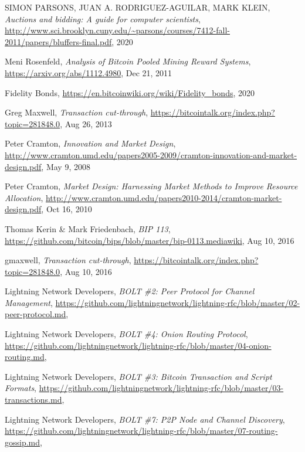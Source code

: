 \documentclass[10pt,a4paper]{article}
\theoremstyle{definition}
\begin{document}
\begin{thebibliography}{9}
    SIMON PARSONS, JUAN A. RODRIGUEZ-AGUILAR, MARK KLEIN, 
    \textit{Auctions and bidding: A guide for computer scientists},
    \url{http://www.sci.brooklyn.cuny.edu/~parsons/courses/7412-fall-2011/papers/bluffers-final.pdf},
    2020

    Meni Rosenfeld,
    \textit{Analysis of Bitcoin Pooled Mining Reward Systems},
    \url{https://arxiv.org/abs/1112.4980},
    Dec 21, 2011

    Fidelity Bonds,
    \url{https://en.bitcoinwiki.org/wiki/Fidelity_bonds},
    2020

    Greg Maxwell,
    \textit{Transaction cut-through},
    \url{https://bitcointalk.org/index.php?topic=281848.0},
    Aug 26, 2013

    Peter Cramton,
    \textit{Innovation and Market Design},
    \url{http://www.cramton.umd.edu/papers2005-2009/cramton-innovation-and-market-design.pdf},
    May 9, 2008

    Peter Cramton,
    \textit{Market Design: Harnessing Market Methods to Improve Resource Allocation},
    \url{http://www.cramton.umd.edu/papers2010-2014/cramton-market-design.pdf},
    Oct 16, 2010

    Thomas Kerin \& Mark Friedenbach,
    \textit{BIP 113},
    \url{https://github.com/bitcoin/bips/blob/master/bip-0113.mediawiki},
    Aug 10, 2016

    gmaxwell,
    \textit{Transaction cut-through},
    \url{https://bitcointalk.org/index.php?topic=281848.0},
    Aug 10, 2016

    Lightning Network Developers,
    \textit{BOLT \#2: Peer Protocol for Channel Management},
    \url{https://github.com/lightningnetwork/lightning-rfc/blob/master/02-peer-protocol.md},

    Lightning Network Developers,
    \textit{BOLT \#4: Onion Routing Protocol},
    \url{https://github.com/lightningnetwork/lightning-rfc/blob/master/04-onion-routing.md},

    Lightning Network Developers,
    \textit{BOLT \#3: Bitcoin Transaction and Script Formats},
    \url{https://github.com/lightningnetwork/lightning-rfc/blob/master/03-transactions.md},

    Lightning Network Developers,
    \textit{BOLT \#7: P2P Node and Channel Discovery},
    \url{https://github.com/lightningnetwork/lightning-rfc/blob/master/07-routing-gossip.md},


\end{thebibliography}
\end{document}
